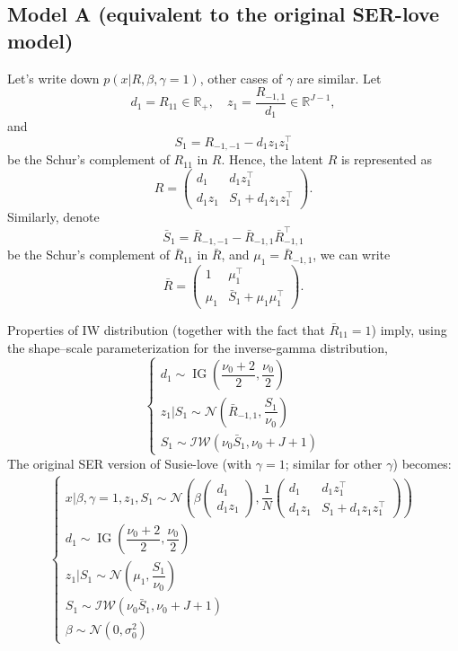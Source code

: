 \documentclass[11pt]{article}
\newcommand{\IG}{\operatorname{IG}}
\begin{document}
\subsection{Model A (equivalent to the original SER-love model)} Let's write down $p(x | R, \beta, \gamma = 1)$, other cases of $\gamma$ are similar. Let 
$$d_1 = R_{11} \in \mathbb{R}_{+}, \quad z_1 = \dfrac{R_{-1, 1}}{d_1} \in \mathbb{R}^{J-1},$$
and 
$$S_1 = R_{-1, -1} - d_1 z_1 z_1^\top $$
be the Schur's complement of $R_{11}$ in $R$. Hence, the latent $R$ is represented as
\begin{equation}\label{eq:R-block}
R = \begin{pmatrix}
d_1 & d_1 z_1^\top \\
d_1 z_1 & S_1 + d_1 z_1 z_1^\top
\end{pmatrix}.
\end{equation}
Similarly, denote
$$\bar S_1 = \bar R_{-1, -1} - \bar R_{-1, 1} \bar R_{-1, 1}^\top $$
be the Schur's complement of $\bar R_{11}$ in $\bar R$, and $\mu_1 =  \bar R_{-1, 1}$, we can write
\begin{equation}\label{eq:R-bar-block}
\bar R = \begin{pmatrix}
1 &\mu_1^\top \\
\mu_1 & \bar S_1 + \mu_1 \mu_1^\top
\end{pmatrix}.
\end{equation}

Properties of IW distribution (together with the fact that $\bar R_{11} = 1$)
imply, using the shape--scale parameterization for the inverse-gamma
distribution,
\begin{equation}
\begin{cases}
d_1 \sim \IG\left(\dfrac{\nu_0 + 2}{2}, \dfrac{\nu_0}{2}\right) \\
z_1 | S_1 \sim \mathcal{N}\left(\bar R_{-1, 1}, \dfrac{S_1}{\nu_0}\right)\\
S_1 \sim \mathcal{IW}(\nu_0 \bar S_1, \nu_0 + J + 1)
\end{cases}
\end{equation}
The original SER version of Susie-love (with $\gamma = 1$; similar for other $\gamma$) becomes:
\begin{align}\label{eq:SER-model-A} 
\begin{cases}
x | \beta, \gamma = 1, z_1, S_1 \sim \mathcal{N}\left(\beta 
\begin{pmatrix}
d_1  \\
d_1 z_1
\end{pmatrix}, 
\dfrac{1}{N} \begin{pmatrix}
d_1 & d_1 z_1^\top \\
d_1 z_1 & S_1 + d_1 z_1 z_1^\top
\end{pmatrix}\right)\\
d_1 \sim \IG\left(\dfrac{\nu_0 + 2}{2}, \dfrac{\nu_0}{2}\right) \\
z_1 | S_1 \sim \mathcal{N}\left(\mu_1, \dfrac{S_1}{\nu_0}\right)\\
S_1 \sim \mathcal{IW}(\nu_0 \bar S_1, \nu_0 + J + 1)\\
\beta \sim \mathcal{N}(0, \sigma_0^2)
\end{cases}
\end{align}
\end{document}
